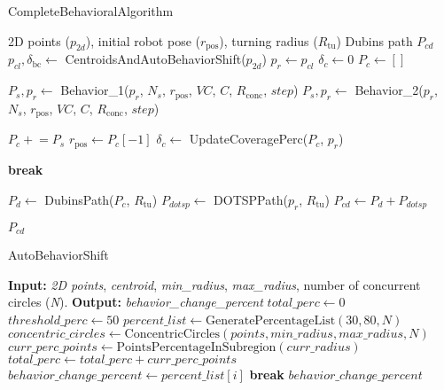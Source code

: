 \begin{algorithm}[H]
    \caption{CompleteBehavioralAlgorithm}
    \label{alg:completebehavioralalgorithm}
    \begin{algorithmic}[1]
    \Require 2D points ($p_{2d}$), initial robot pose ($r_{\text{pos}}$), turning radius ($R_{\text{tu}}$) 
    \Ensure Dubins path $P_{cd}$
    \State $p_{cl}, \delta_{\text{bc}} \leftarrow$ CentroidsAndAutoBehaviorShift($p_{2d}$)
    \State $p_r \leftarrow p_{cl}$
    \State $\delta_c \leftarrow 0$
    \State $P_c \leftarrow []$
    
            \State $P_s, p_r \leftarrow$ Behavior\_1($p_r$, $N_s$, $r_{\text{pos}}$, $VC$, $C$, $R_{\text{conc}}$, $step$)
        \Else
            \State $P_s, p_r \leftarrow$ Behavior\_2($p_r$, $N_s$, $r_{\text{pos}}$, $VC$, $C$, $R_{\text{conc}}$, $step$)
        \EndIf
        
        \State $P_c \mathrel{+}= P_s$
        \State $r_{\text{pos}} \leftarrow P_c[-1]$
        \State $\delta_c \leftarrow$ UpdateCoveragePerc($P_c$, $p_r$)
        
            \State \textbf{break}
        \EndIf
    \EndWhile
    
    \State $P_d \leftarrow$ DubinsPath($P_c$, $R_{\text{tu}}$)
    \State $P_{dotsp} \leftarrow$ DOTSPPath($p_r$, $R_{\text{tu}}$)
    \State $P_{cd} \leftarrow P_d + P_{dotsp}$

    \State \Return $P_{cd}$
    \end{algorithmic}
\end{algorithm}
    

    

\begin{algorithm}[H]
    \caption{AutoBehaviorShift}
    \begin{algorithmic}[1]
    \Statex \textbf{Input: } \textit{2D points}, \textit{centroid}, \textit{min\_radius}, \textit{max\_radius}, number of concurrent circles (\textit{N}).
    \Statex \textbf{Output: }\textit{behavior\_change\_percent}
    \newline
    \State $total\_perc \gets 0$
    \State $threshold\_perc \gets 50$
    \State $percent\_list \gets \text{GeneratePercentageList}(30, 80, N)$ 
    \State $concentric\_circles \gets \text{ConcentricCircles}(points, min\_radius, max\_radius, N)$
        \State $curr\_perc\_points \gets \text{PointsPercentageInSubregion}(curr\_radius)$
        \State $total\_perc \gets total\_perc + curr\_perc\_points$
            \State $behavior\_change\_percent \gets percent\_list[i]$
            \State \textbf{break}
        \EndIf
    \EndFor
    \State \Return $behavior\_change\_percent$
    \end{algorithmic}
\end{algorithm}


